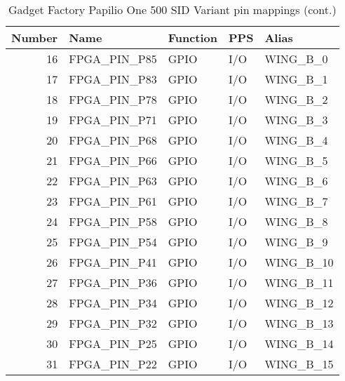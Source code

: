 \documentclass[12pt,a4paper,openany,smallheadings,headinclude,headsepline,final]{scrreprt}
\def \board {Gadget Factory Papilio One 500 SID Variant }
\begin{document}
\begin{table}[H]
\begin{center}
\begin{tabularx}{14cm}{rlllX}
Number & Name & Function & PPS & Alias \\
\hline
16 &FPGA\_PIN\_P85 & GPIO & I/O & WING\_B\_0 \\
17 &FPGA\_PIN\_P83 & GPIO & I/O & WING\_B\_1 \\
18 &FPGA\_PIN\_P78 & GPIO & I/O & WING\_B\_2 \\
19 &FPGA\_PIN\_P71 & GPIO & I/O & WING\_B\_3 \\
20 &FPGA\_PIN\_P68 & GPIO & I/O & WING\_B\_4 \\
21 &FPGA\_PIN\_P66 & GPIO & I/O & WING\_B\_5 \\
22 &FPGA\_PIN\_P63 & GPIO & I/O & WING\_B\_6 \\
23 &FPGA\_PIN\_P61 & GPIO & I/O & WING\_B\_7 \\
24 &FPGA\_PIN\_P58 & GPIO & I/O & WING\_B\_8 \\
25 &FPGA\_PIN\_P54 & GPIO & I/O & WING\_B\_9 \\
26 &FPGA\_PIN\_P41 & GPIO & I/O & WING\_B\_10 \\
27 &FPGA\_PIN\_P36 & GPIO & I/O & WING\_B\_11 \\
28 &FPGA\_PIN\_P34 & GPIO & I/O & WING\_B\_12 \\
29 &FPGA\_PIN\_P32 & GPIO & I/O & WING\_B\_13 \\
30 &FPGA\_PIN\_P25 & GPIO & I/O & WING\_B\_14 \\
31 &FPGA\_PIN\_P22 & GPIO & I/O & WING\_B\_15
\end{tabularx}
\caption{\board pin mappings (cont.)}
\end{center}
\end{table}
\end{document}
